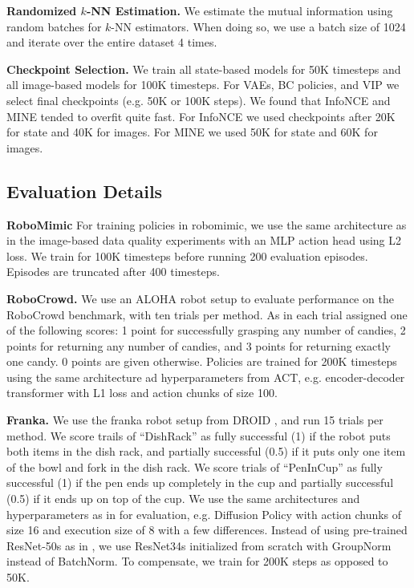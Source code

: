 \noindent \textbf{Randomized $k$-NN Estimation.} We estimate the mutual information using random batches for $k$-NN estimators. When doing so, we use a batch size of 1024 and iterate over the entire dataset 4 times.
\vspace{0.05in}

\noindent \textbf{Checkpoint Selection.} We train all state-based models for 50K timesteps and all image-based models for 100K timesteps. For VAEs, BC policies, and VIP we select final checkpoints (e.g. 50K or 100K steps). We found that InfoNCE and MINE tended to overfit quite fast. For InfoNCE we used checkpoints after 20K for state and 40K for images. For MINE we used 50K for state and 60K for images.


\subsection{Evaluation Details} 

\noindent \textbf{RoboMimic} For training policies in robomimic, we use the same architecture as in the image-based data quality experiments with an MLP action head using L2 loss. We train for 100K timesteps before running 200 evaluation episodes. Episodes are truncated after 400 timesteps.

\vspace{0.05in}

\noindent \textbf{RoboCrowd.} We use an ALOHA robot setup to evaluate performance on the RoboCrowd benchmark, with ten trials per method. As in \citet{mirchandani2024robocrowd} each trial assigned one of the following scores: 1 point for successfully grasping any number of candies, 2 points for returning any number of candies, and 3 points for returning exactly one candy. 0 points are given otherwise. Policies are trained for 200K timesteps using the same architecture ad hyperparameters from ACT, e.g. encoder-decoder transformer with L1 loss and action chunks of size 100.

\vspace{0.05in}


\noindent \textbf{Franka.} We use the franka robot setup from DROID \citet{droid}, and run 15 trials per method. We score trails of ``DishRack'' as fully successful (1) if the robot puts both items in the dish rack, and partially successful (0.5) if it puts only one item of the bowl and fork in the dish rack. We score trials of ``PenInCup'' as fully successful (1) if the pen ends up completely in the cup and partially successful (0.5) if it ends up on top of the cup. We use the same architectures and hyperparameters as in \citet{droid} for evaluation, e.g. Diffusion Policy \citep{chi2023diffusion} with action chunks of size 16 and execution size of 8 with a few differences. Instead of using pre-trained ResNet-50s as in \citet{droid}, we use ResNet34s initialized from scratch with GroupNorm instead of BatchNorm. To compensate, we train for 200K steps as opposed to 50K.





